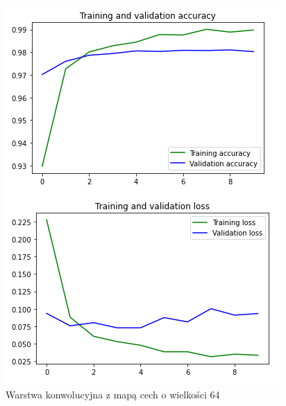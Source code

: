 \documentclass{article}
\begin{document}
\begin{figure}[!htb]
  \centering
  \includegraphics[width=\linewidth]{feature_64.png}
  \caption{Warstwa konwolucyjna z mapą cech o wielkości 64}
\end{figure}
\end{document}
